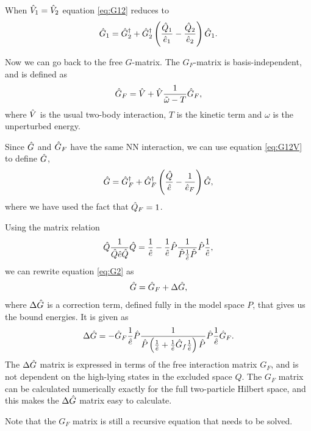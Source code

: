 When $\hat{V}_1 = \hat{V}_2$ equation \ref{eq:G12} reduces to
\begin{align}
	\g_1 = \g_2^{\dagger} + \g_2^{\dagger}
	\left(\frac{\q_1}{\e_1}-\frac{\q_2}{\e_2}\right)\g_1.
	\label{eq:G12V}
\end{align}

Now we can go back to the free $G$-matrix. The $G_F$-matrix is basis-independent, and is defined as
\begin{align}
	\g_F = \v + \v\frac{1}{\tilde\omega-T}\g_F,
	\label{eq:GF}
\end{align}
where $\hat{V}$ is the usual two-body interaction, $T$ is the kinetic term and
$\omega$ is the unperturbed energy.

Since $\hat{G}$ and $\hat{G}_F$ have the same NN interaction, we can use equation
\ref{eq:G12V} to define $\hat{G}$,
\begin{align}
	\g = \g_F^{\dagger} + \g_F^{\dagger}
	\left(\frac{\q}{\e}-\frac{1}{\e_F}\right)\g,
	\label{eq:GGF}
\end{align}
where we have used the fact that $\hat{Q}_F = 1$.

Using the matrix relation
\begin{align}
	\hat{Q}\frac{1}{\hat{Q}\hat{e}\hat{Q}}\hat{Q} = \frac1{\hat{e}}-\frac1{\hat{e}}\hat{P}\frac{1}{\hat{P}\frac1{\hat{e}}\hat{P}}\hat{P}\frac1{\hat{e}},
\end{align}
we can rewrite equation \ref{eq:G2} as
\begin{align}
	\g = \g_F+\Delta\g,
	\label{eq:G-matrix}
\end{align}
where $\Delta\hat{G}$ is a correction term, defined fully in the model space $P$,
that gives us the bound energies. It is given as
\begin{align}
	\Delta\hat{G} = -\hat{G}_F\frac1{\hat{e}}\hat{P}\frac{1}{\hat{P}\left(\frac1{\hat{e}}+\frac1{\hat{e}}\hat{G}_f\frac1{\hat{e}}\right)\hat{P}}\hat{P}\frac1{\hat{e}}\hat{G}_F.
\end{align}
The $\Delta\hat{G}$ matrix is expressed in terms of the free interaction matrix
$G_F$, and is not dependent on the high-lying states in the excluded space $Q$.
The $G_F$ matrix can be calculated numerically exactly for the full
two-particle Hilbert space, and this makes the $\Delta\hat{G}$ matrix easy to
calculate.

Note that the $G_F$ matrix is still a recursive equation that needs to be
solved.

